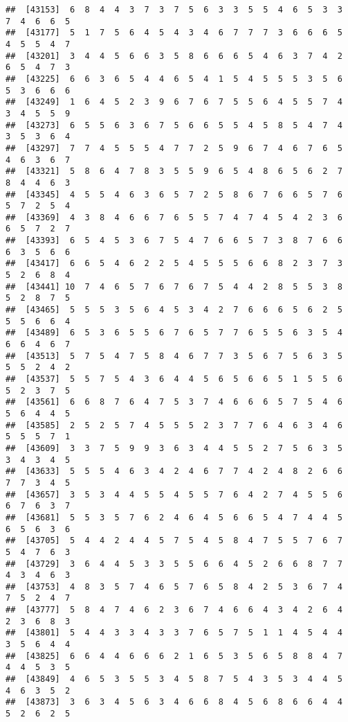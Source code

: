 \documentclass[
]{book}
\begin{document}
\begin{verbatim}
##  [43153]  6  8  4  4  3  7  3  7  5  6  3  3  5  5  4  6  5  3  3  7  4  6  6  5
##  [43177]  5  1  7  5  6  4  5  4  3  4  6  7  7  7  3  6  6  6  5  4  5  5  4  7
##  [43201]  3  4  4  5  6  6  3  5  8  6  6  6  5  4  6  3  7  4  2  6  5  4  7  3
##  [43225]  6  6  3  6  5  4  4  6  5  4  1  5  4  5  5  5  3  5  6  5  3  6  6  6
##  [43249]  1  6  4  5  2  3  9  6  7  6  7  5  5  6  4  5  5  7  4  3  4  5  5  9
##  [43273]  6  5  5  6  3  6  7  5  6  6  5  5  4  5  8  5  4  7  4  3  5  3  6  4
##  [43297]  7  7  4  5  5  5  4  7  7  2  5  9  6  7  4  6  7  6  5  4  6  3  6  7
##  [43321]  5  8  6  4  7  8  3  5  5  9  6  5  4  8  6  5  6  2  7  8  4  4  6  3
##  [43345]  4  5  5  4  6  3  6  5  7  2  5  8  6  7  6  6  5  7  6  5  7  2  5  4
##  [43369]  4  3  8  4  6  6  7  6  5  5  7  4  7  4  5  4  2  3  6  6  5  7  2  7
##  [43393]  6  5  4  5  3  6  7  5  4  7  6  6  5  7  3  8  7  6  6  6  3  5  6  6
##  [43417]  6  6  5  4  6  2  2  5  4  5  5  5  6  6  8  2  3  7  3  5  2  6  8  4
##  [43441] 10  7  4  6  5  7  6  7  6  7  5  4  4  2  8  5  5  3  8  5  2  8  7  5
##  [43465]  5  5  5  3  5  6  4  5  3  4  2  7  6  6  6  5  6  2  5  5  5  6  6  4
##  [43489]  6  5  3  6  5  5  6  7  6  5  7  7  6  5  5  6  3  5  4  6  6  4  6  7
##  [43513]  5  7  5  4  7  5  8  4  6  7  7  3  5  6  7  5  6  3  5  5  5  2  4  2
##  [43537]  5  5  7  5  4  3  6  4  4  5  6  5  6  6  5  1  5  5  6  5  2  3  7  5
##  [43561]  6  6  8  7  6  4  7  5  3  7  4  6  6  6  5  7  5  4  6  5  6  4  4  5
##  [43585]  2  5  2  5  7  4  5  5  5  2  3  7  7  6  4  6  3  4  6  5  5  5  7  1
##  [43609]  3  3  7  5  9  9  3  6  3  4  4  5  5  2  7  5  6  3  5  3  4  3  4  5
##  [43633]  5  5  5  4  6  3  4  2  4  6  7  7  4  2  4  8  2  6  6  7  7  3  4  5
##  [43657]  3  5  3  4  4  5  5  4  5  5  7  6  4  2  7  4  5  5  6  6  7  6  3  7
##  [43681]  5  5  3  5  7  6  2  4  6  4  5  6  6  5  4  7  4  4  5  6  5  6  3  6
##  [43705]  5  4  4  2  4  4  5  7  5  4  5  8  4  7  5  5  7  6  7  5  4  7  6  3
##  [43729]  3  6  4  4  5  3  3  5  5  6  6  4  5  2  6  6  8  7  7  4  3  4  6  3
##  [43753]  4  8  3  5  7  4  6  5  7  6  5  8  4  2  5  3  6  7  4  7  5  2  4  7
##  [43777]  5  8  4  7  4  6  2  3  6  7  4  6  6  4  3  4  2  6  4  2  3  6  8  3
##  [43801]  5  4  4  3  3  4  3  3  7  6  5  7  5  1  1  4  5  4  4  3  5  6  4  4
##  [43825]  6  6  4  4  6  6  6  2  1  6  5  3  5  6  5  8  8  4  7  4  4  5  3  5
##  [43849]  4  6  5  3  5  5  3  4  5  8  7  5  4  3  5  3  4  4  5  4  6  3  5  2
##  [43873]  3  6  3  4  5  6  3  4  6  6  8  4  5  6  8  6  6  4  4  5  2  6  2  5

\end{verbatim}
\end{document}
